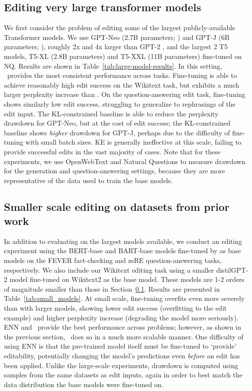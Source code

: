 \documentclass{article}
\begin{document}
\subsection{Editing very large transformer models}
\label{sec:large-models}
We first consider the problem of editing some of the largest publicly-available Transformer models. We use GPT-Neo (2.7B parameters; \citealp{gpt-neo}) and GPT-J (6B parameters; \citealp{gpt-j}), roughly 2x and 4x larger than GPT-2 \citep{radford2019language}, and the largest 2 T5 models, T5-XL (2.8B parameters) and T5-XXL (11B parameters) \citep{2020t5} fine-tuned on NQ. Results are shown in Table~\ref{tab:large-model-results}. In this setting, \name~provides the most consistent performance across tasks. Fine-tuning is able to achieve reasonably high edit success on the Wikitext task, but exhibits a much larger perplexity increase than \name. On the question-answering edit task, fine-tuning shows similarly low edit success, struggling to generalize to rephrasings of the edit input. The KL-constrained baseline is able to reduce the perplexity drawdown for GPT-Neo, but at the cost of edit success; the KL-constrained baseline shows \textit{higher} drawdown for GPT-J, perhaps due to the difficulty of fine-tuning with small batch sizes. KE is generally ineffective at this scale, failing to provide successful edits in the vast majority of cases. Note that for these experiments, we use OpenWebText \citep{Gokaslan2019OpenWeb} and Natural Questions \citep{kwiatkowski2019natural} to measure drawdown for the generation and question-answering settings, because they are more representative of the data used to train the base models.

\subsection{Smaller scale editing on datasets from prior work}
\label{sec:small-scale}

In addition to evaluating on the largest models available, we conduct an editing experiment using the BERT-base and BART-base models fine-tuned by \cite{Cao2021EditingFK} as base models on the FEVER fact-checking and zsRE question-answering tasks, respectively. We also include our Wikitext editing task using a smaller distilGPT-2 model \citep{wolf2019hugging} fine-tuned on Wikitext2 \citep{distilgpt2} as the base model. These models are 1-2 orders of magnitude smaller than those in Section~\ref{sec:large-models}. Results are presented in Table~\ref{tab:small_models}. At small scale, fine-tuning overfits even more severely than with larger models, showing lower edit success (overfitting to the edit example) and higher perplexity increase (degrading the model more seriously). ENN and \name~provide the best performance across problems; however, as shown in the previous section, \name~does so in a much more scalable manner. One difficulty of using ENN is that the pre-trained model itself must be fine-tuned to `provide' editability, potentially changing the model's predictions even \textit{before} an edit has been applied. Unlike the large-scale experiments, drawdown is computed using samples from the same datasets as edit inputs, again in order to best match the data distribution the base models were fine-tuned on.
\end{document}

